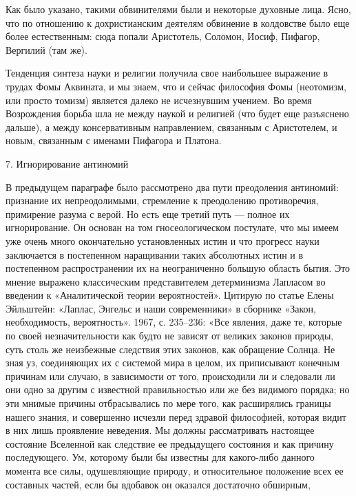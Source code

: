 Как  было  указано,  такими  обвинителями были  и  некоторые  духовные
лица. Ясно,  что по  отношению к  дохристианским деятелям  обвинение в
колдовстве  было  еще  более  естественным:  сюда  попали  Аристотель,
Соломон, Иосиф, Пифагор, Вергилий (там же).

Тенденция синтеза науки и религии получила свое наибольшее выражение в
трудах  Фомы  Аквината,  и  мы  знаем, что  и  сейчас  философия  Фомы
(неотомизм, или просто томизм) является далеко не исчезнувшим учением.
Во время Возрождения борьба шла не  между наукой и религией (что будет
еще разъяснено дальше), а между консервативным направлением, связанным
с Аристотелем, и новым, связанным с именами Пифагора и Платона.

7. Игнорирование антиномий

В  предыдущем   параграфе  было   рассмотрено  два   пути  преодоления
антиномий:  признание  их  непреодолимыми,  стремление  к  преодолению
противоречия,  примирение разума  с  верой. Но  есть  еще третий  путь
---  полное  их  игнорирование.  Он основан  на  том  гносеологическом
постулате,  что мы  имеем уже  очень много  окончательно установленных
истин  и  что прогресс  науки  заключается  в постепенном  наращивании
таких  абсолютных   истин  и  в  постепенном   распространении  их  на
неограниченно большую область бытия.  Это мнение выражено классическим
представителем  детерминизма  Лапласом  во введении  к  «Аналитической
теории  вероятностей». Цитирую  по  статье  Елены Эйльштейн:  «Лаплас,
Энгельс  и  наши  современники»   в  сборнике  «Закон,  необходимость,
вероятность». 1967,  с. 235--236:  «Все явления,  даже те,  которые по
своей  незначительности  как  будто  не  зависят  от  великих  законов
природы,  суть  столь  же   неизбежные  следствия  этих  законов,  как
обращение Солнца. Не зная уз, соединяющих  их с системой мира в целом,
их приписывают  конечным причинам или  случаю, в зависимости  от того,
происходили  ли  и  следовали  ли  они  одно  за  другим  с  известной
правильностью  или же  без  видимого порядка;  но  эти мнимые  причины
отбрасывались по мере  того, как расширялись границы  нашего знания, и
совершенно исчезли перед здравой философией,  которая видит в них лишь
проявление  неведения.  Мы  должны рассматривать  настоящее  состояние
Вселенной  как  следствие  ее  предыдущего  состояния  и  как  причину
последующего. Ум,  которому были  бы известны для  какого-либо данного
момента все силы, одушевляющие природу, и относительное положение всех
ее составных частей, если бы вдобавок он оказался достаточно обширным,
